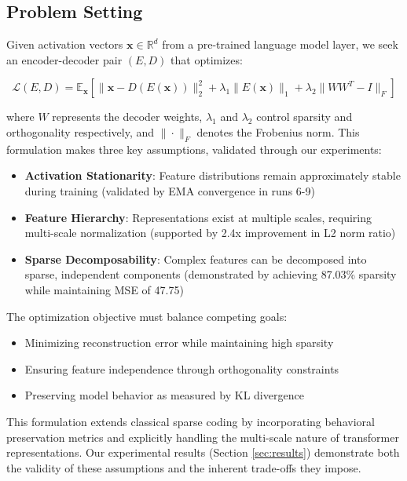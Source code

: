 \documentclass{article} %
\begin{document}
\subsection{Problem Setting}
Given activation vectors $\mathbf{x} \in \mathbb{R}^d$ from a pre-trained language model layer, we seek an encoder-decoder pair $(E,D)$ that optimizes:

\begin{equation}
    \mathcal{L}(E,D) = \mathbb{E}_\mathbf{x}[\|\mathbf{x} - D(E(\mathbf{x}))\|_2^2 + \lambda_1\|E(\mathbf{x})\|_1 + \lambda_2\|WW^T - I\|_F]
\end{equation}

where $W$ represents the decoder weights, $\lambda_1$ and $\lambda_2$ control sparsity and orthogonality respectively, and $\|\cdot\|_F$ denotes the Frobenius norm. This formulation makes three key assumptions, validated through our experiments:

\begin{itemize}
    \item \textbf{Activation Stationarity}: Feature distributions remain approximately stable during training (validated by EMA convergence in runs 6-9)
    \item \textbf{Feature Hierarchy}: Representations exist at multiple scales, requiring multi-scale normalization (supported by 2.4x improvement in L2 norm ratio)
    \item \textbf{Sparse Decomposability}: Complex features can be decomposed into sparse, independent components (demonstrated by achieving 87.03\% sparsity while maintaining MSE of 47.75)
\end{itemize}

The optimization objective must balance competing goals:
\begin{itemize}
    \item Minimizing reconstruction error while maintaining high sparsity
    \item Ensuring feature independence through orthogonality constraints
    \item Preserving model behavior as measured by KL divergence
\end{itemize}

This formulation extends classical sparse coding by incorporating behavioral preservation metrics and explicitly handling the multi-scale nature of transformer representations. Our experimental results (Section \ref{sec:results}) demonstrate both the validity of these assumptions and the inherent trade-offs they impose.
\end{document}
